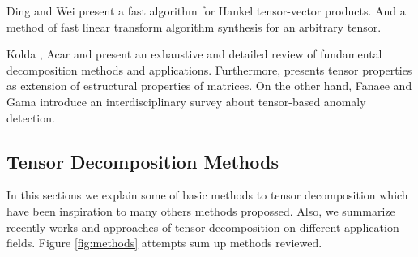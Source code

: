 \documentclass[letterpaper,12pt]{article}
\begin{document}








Ding and Wei \cite{Ding2015} present a fast algorithm for Hankel tensor-vector products. And \cite{Dourbal2016} a method of fast linear transform algorithm synthesis for an arbitrary tensor.


Kolda \cite{Kolda2009}, Acar \cite{Acar2009} and \cite{Comon2014} present an exhaustive and detailed review of fundamental decomposition methods and applications. Furthermore, \cite{Dartois2016} presents tensor properties as extension of estructural properties of matrices. On the other hand, Fanaee and Gama \cite{Fanaee-T2016} introduce an interdisciplinary survey about tensor-based anomaly detection.



\subsection{Tensor Decomposition Methods}\label{sec:tensor_methods}

In this sections we explain some of basic methods to tensor decomposition which have been inspiration to many others methods propossed. Also, we summarize recently  works and approaches of tensor decomposition on different application fields. Figure \ref{fig:methods} attempts sum up methods reviewed.
\end{document}
